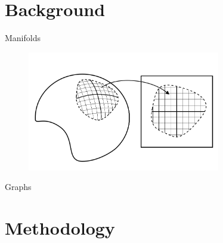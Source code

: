 \documentclass{beamer}
\begin{document}
\section{Background}
\begin{frame}{Manifolds}
    \begin{figure}%
    \centering \includegraphics[width=0.75\textwidth]{manifold_general.png}
  \end{figure} 
\end{frame}    

\begin{frame}{Graphs}
  \begin{figure}%
    \centering
    \qquad
    \label{fig:example}%
\end{figure}  
\end{frame} 

\section{Methodology}
\end{document}
